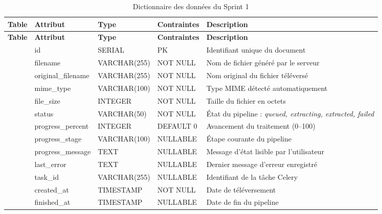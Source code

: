 \renewcommand{\arraystretch}{1.5}
\begin{longtable}{|>{\small\bfseries\centering\arraybackslash}p{2.5cm}|>{\ttfamily\raggedright\arraybackslash}p{3.6cm}|>{\raggedright\arraybackslash}p{2.5cm}|>{\raggedright\arraybackslash}p{2.2cm}|>{\raggedright\arraybackslash}p{3.9cm}|}
\caption{Dictionnaire des données du Sprint 1}
\label{tab:dict_sprint1} \\
\hline
\rowcolor[HTML]{D6E4F0}
{\normalfont\textbf{Table}} & {\normalfont\textbf{Attribut}} & {\normalfont\textbf{Type}} & {\normalfont\textbf{Contraintes}} & {\normalfont\textbf{Description}} \\
\hline
\endfirsthead
\hline
\rowcolor[HTML]{D6E4F0}
{\normalfont\textbf{Table}} & {\normalfont\textbf{Attribut}} & {\normalfont\textbf{Type}} & {\normalfont\textbf{Contraintes}} & {\normalfont\textbf{Description}} \\
\hline
\endhead
\hline
\endfoot
\hline
\endlastfoot

\rowcolor[HTML]{EBF5FB}
\multirow{13}{*}{\normalfont\texttt{documents}}
 & id & \normalfont SERIAL & \normalfont PK & \normalfont Identifiant unique du document \\
\cline{2-5}
 & filename & \normalfont VARCHAR(255) & \normalfont NOT NULL & \normalfont Nom de fichier généré par le serveur \\
\cline{2-5}
 & original\_filename & \normalfont VARCHAR(255) & \normalfont NOT NULL & \normalfont Nom original du fichier téléversé \\
\cline{2-5}
 & mime\_type & \normalfont VARCHAR(100) & \normalfont NOT NULL & \normalfont Type MIME détecté automatiquement \\
\cline{2-5}
 & file\_size & \normalfont INTEGER & \normalfont NOT NULL & \normalfont Taille du fichier en octets \\
\cline{2-5}
 & status & \normalfont VARCHAR(50) & \normalfont NOT NULL & \normalfont État du pipeline : \textit{queued, extracting, extracted, failed} \\
\cline{2-5}
 & progress\_percent & \normalfont INTEGER & \normalfont DEFAULT 0 & \normalfont Avancement du traitement (0–100) \\
\cline{2-5}
 & progress\_stage & \normalfont VARCHAR(100) & \normalfont NULLABLE & \normalfont Étape courante du pipeline \\
\cline{2-5}
 & progress\_message & \normalfont TEXT & \normalfont NULLABLE & \normalfont Message d'état lisible par l'utilisateur \\
\cline{2-5}
 & last\_error & \normalfont TEXT & \normalfont NULLABLE & \normalfont Dernier message d'erreur enregistré \\
\cline{2-5}
 & task\_id & \normalfont VARCHAR(255) & \normalfont NULLABLE & \normalfont Identifiant de la tâche Celery \\
\cline{2-5}
 & created\_at & \normalfont TIMESTAMP & \normalfont NOT NULL & \normalfont Date de téléversement \\
\cline{2-5}
 & finished\_at & \normalfont TIMESTAMP & \normalfont NULLABLE & \normalfont Date de fin du pipeline \\
\hline


\end{longtable}
